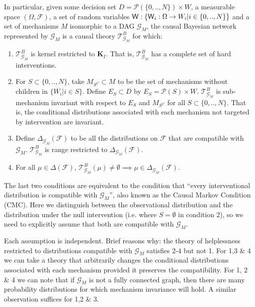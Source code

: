 \begin{definition}
In particular, given some  decision set $D=\mathscr{P}(\{0,..,N\})\times W$, a measurable space $(\Omega,\mathcal{F})$, a set of random variables $\mathsf{W}:\{\mathsf{W}_i:\Omega\to W_i|i\in \{0,..,N\}\}$ and a set of mechanisms $M$ isomorphic to a DAG $\mathcal{G}_M$, the causal Bayesian network represented by $\mathcal{G}_M$ is a causal theory $\mathscr{T}^B_{\mathcal{G}_M}$ for which:
\begin{enumerate}
    \item $\mathscr{T}^B_{\mathcal{G}_M}$ is kernel restricted to $\mathbf{K}_I$. That is, $\mathscr{T}^B_{\mathcal{G}_M}$ has a complete set of hard interventions.
    \item For $S\subset \{0,..,N\}$, take $M_{S^C}\subset M$ to be the set of mechanisms without children in $\{W_i|i\in S\}$. Define $E_S\subset D$ by $E_S = \mathscr{P}(S)\times W$. $\mathscr{T}^B_{\mathcal{G}_M}$ is sub-mechanism invariant with respect to $E_S$ and $M_{S^C}$ for all $S\subset\{0,..,N\}$. That is, the conditional distributions associated with each mechanism not targeted by intervention are invariant.
    \item Define $\Delta_{\mathcal{G}_M}(\mathcal{F})$ to be all the distributions on $\mathcal{F}$ that are compatible with $\mathcal{G}_M$. $\mathscr{T}^B_{\mathcal{G}_M}$ is range restricted to $\Delta_{\mathcal{G}_M}(\mathcal{F})$.
    \item For all $\mu\in \Delta(\mathcal{F})$, $\mathscr{T}^B_{\mathcal{G}_M}(\mu)\neq \emptyset\implies \mu\in \Delta_{\mathcal{G}_M}(\mathcal{F})$. 
\end{enumerate}
\end{definition}


The last two conditions are equivalent to the condition that ``every interventional distribution is compatible with $\mathcal{G}_M$'', also known as the Causal Markov Condition (CMC). Here we distinguish between the observational distribution and the distribution under the null intervention (i.e. where $S=\emptyset$ in condition 2), so we need to explicitly assume that both are compatible with $\mathcal{G}_M$.

Each assumption is independent. Brief reasons why: the theory of helplessness restricted to distributions compatible with $\mathcal{G}_M$ satisfies 2-4 but not 1. For 1,3 \& 4 we can take a theory that arbitrarily changes the conditional distributions associated with each mechanism provided it preserves the compatibility. For 1, 2 \& 4 we can note that if $\mathcal{G}_M$ is not a fully connected graph, then there are many probability distributions for which mechanism invariance will hold. A similar observation suffices for 1,2 \& 3.

